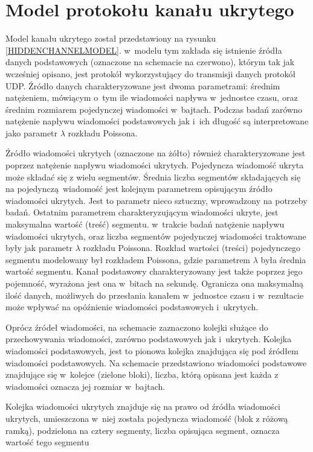 \documentclass[a4paper, twoside, 12pt]{report}
\begin{document}
    \section{Model protokołu kanału ukrytego}

    Model kanału ukrytego został przedstawiony na rysunku \ref{HIDDENCHANNELMODEL}. w~modelu tym zakłada się
    istnienie źródła danych podstawowych (oznaczone na schemacie na czerwono),
    którym tak jak wcześniej opisano, jest
    protokół wykorzystujący do transmisji danych protokół UDP. Źródło danych
    charakteryzowane jest dwoma parametrami: średnim natężeniem, mówiącym
    o~tym ile wiadomości napływa w~jednostce czasu, oraz średnim rozmiarem
    pojedynczej wiadomości w~bajtach. Podczas badań zarówno natężenie napływu wiadomości
    podstawowych jak i~ich długość są interpretowane jako parametr \(\lambda \) rozkładu
    Poissona.

    Źródło wiadomości ukrytych (oznaczone na żółto) również charakteryzowane jest poprzez natężenie
    napływu wiadomości ukrytych. Pojedyncza wiadomość ukryta może składać się z wielu
    segmentów. Średnia liczba segmentów składających się na pojedynczą wiadomość
    jest kolejnym parametrem opisującym źródło wiadomości ukrytych. Jest to parametr
    nieco sztuczny, wprowadzony na potrzeby badań. Ostatnim parametrem charakteryzującym
    wiadomości ukryte, jest maksymalna wartość (treść) segmentu. w~trakcie badań
    natężenie napływu wiadomości ukrytych, oraz liczba segmentów pojedynczej wiadomości
    traktowane były jak parametr \(\lambda \) rozkładu Poissona. Rozkład wartości (treści)
    pojedynczego segmentu modelowany był rozkładem Poissona, gdzie parametrem \(\lambda\) była
    średnia wartość segmentu. Kanał podstawowy charakteryzowany jest także
    poprzez jego pojemność, wyrażona jest ona w~bitach na sekundę. Ogranicza ona
    maksymalną ilość danych, możliwych do przesłania kanałem w~jednostce czasu i
    w~rezultacie może wpływać na opóźnienie wiadomości podstawowych i~ukrytych.

    Oprócz źródeł wiadomości, na schemacie zaznaczono kolejki służące do przechowywania
    wiadomości, zarówno podstawowych jak i~ukrytych. Kolejka wiadomości podstawowych,
    jest to pionowa kolejka znajdująca się pod źródłem wiadomości podstawowych.
    Na schemacie przedstawiono wiadomości podstawowe znajdujące się w~kolejce (zielone bloki),
    liczba, którą opisana jest każda z wiadomości oznacza jej rozmiar w~bajtach.

    Kolejka wiadomości ukrytych znajduje się na prawo od źródła wiadomości ukrytych,
    umieszczona w~niej została pojedyncza wiadomość (blok z różową ramką), podzielona
    na cztery segmenty, liczba opisująca segment, oznacza wartość tego segmentu
\end{document}
